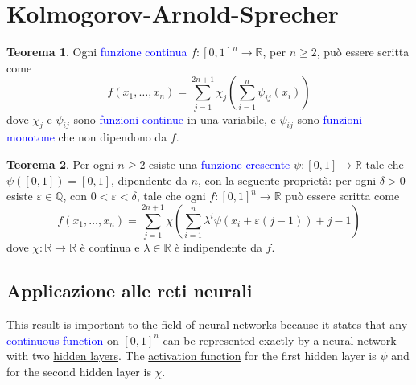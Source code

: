 \documentclass[10pt]{book}
\newcommand{\1}{\mathds{1}}
\newcommand{\R}{\mathds{R}}
\newcommand{\Q}{\mathds{Q}}
\theoremstyle{definition}%
\newtheorem{thm}{Teorema}[section]
\theoremstyle{plain}
\theoremstyle{remark}
\renewcommand{\href}[2]{\textcolor{blue}{#2}}
\begin{document}
\section{Kolmogorov-Arnold-Sprecher}
\label{sec:orgd8d9f17}

\begin{thm}
Ogni \href{../../../../../org/roam/20250103103252-funzione_continua.org}{funzione continua} \(f:[0,1]^{n}\to \R\), per \(n\ge 2\), può essere scritta come
\begin{equation*}
f(x_{1},\dots,x_{n}) = \sum_{j=1}^{2n+1}\chi_{j}\left(\sum_{i=1}^{n}\psi_{ij}(x_{i})\right)
\end{equation*}
dove \(\chi_{j}\) e \(\psi_{ij}\) sono \href{../../../../../org/roam/20250103103252-funzione_continua.org}{funzioni continue} in una variabile, e \(\psi_{ij}\) sono \href{../../../../../org/roam/20250203132953-funzione_monotona.org}{funzioni monotone} che non dipendono da \(f\).
\label{thm10.3.1}
\end{thm}

\begin{thm}
Per ogni \(n\ge {2}\) esiste una \href{../../../../../org/roam/20250203132953-funzione_monotona.org}{funzione crescente} \(\psi:[0,1]\to \R\) tale che \(\psi\left([0,1]\right)=[0,1]\), dipendente da \(n\), con la seguente proprietà: per ogni \(\delta>0\) esiste \(\varepsilon \in \Q\), con \(0<\varepsilon<\delta\), tale che ogni \(f:[0,1]^{n}\to \R\) può essere scritta come
\begin{equation*}
f(x_{1},\dots,x_{n}) = \sum_{j=1}^{2n+1} \chi\left(
\sum_{i=1}^{n}\lambda^{i}\psi(x_{i}+\varepsilon(j-1)) +j-1
\right)
\end{equation*}
dove \(\chi:\R\to \R\) è continua e \(\lambda \in \R\) è indipendente da \(f\).
\label{thm10.3.2}
\end{thm}
\subsection{Applicazione alle reti neurali}
\label{sec:org33dc803}

This result is important to the field of \hyperref[sec:org1346ff2]{neural networks} because it states that any \href{../../../../../org/roam/20250103103252-funzione_continua.org}{continuous function} on \([0,1]^{n}\) can be \hyperref[sec:org3a813f6]{represented exactly} by a \hyperref[sec:org1346ff2]{neural network} with two \hyperref[sec:org239d5ff]{hidden layers}. The \hyperref[sec:org0042486]{activation function} for the first hidden layer is \(\psi\) and for the second hidden layer is \(\chi\).
\end{document}
